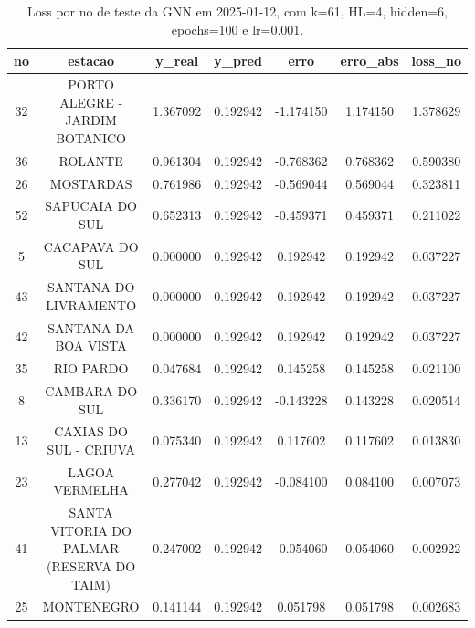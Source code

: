 \begin{table}[h]
\centering
\caption{Loss por no de teste da GNN em 2025-01-12, com k=61, HL=4, hidden=6, epochs=100 e lr=0.001.}
\label{tab:gnn_loss_k61_hl4_h6_e100_d20250112}
\begin{tabular}{ccccccc}
\toprule
no & estacao & y\_real & y\_pred & erro & erro\_abs & loss\_no \\
\midrule
32 & PORTO ALEGRE - JARDIM BOTANICO & 1.367092 & 0.192942 & -1.174150 & 1.174150 & 1.378629 \\
36 & ROLANTE & 0.961304 & 0.192942 & -0.768362 & 0.768362 & 0.590380 \\
26 & MOSTARDAS & 0.761986 & 0.192942 & -0.569044 & 0.569044 & 0.323811 \\
52 & SAPUCAIA DO SUL & 0.652313 & 0.192942 & -0.459371 & 0.459371 & 0.211022 \\
5 & CACAPAVA DO SUL & 0.000000 & 0.192942 & 0.192942 & 0.192942 & 0.037227 \\
43 & SANTANA DO LIVRAMENTO & 0.000000 & 0.192942 & 0.192942 & 0.192942 & 0.037227 \\
42 & SANTANA DA BOA VISTA & 0.000000 & 0.192942 & 0.192942 & 0.192942 & 0.037227 \\
35 & RIO PARDO & 0.047684 & 0.192942 & 0.145258 & 0.145258 & 0.021100 \\
8 & CAMBARA DO SUL & 0.336170 & 0.192942 & -0.143228 & 0.143228 & 0.020514 \\
13 & CAXIAS DO SUL - CRIUVA & 0.075340 & 0.192942 & 0.117602 & 0.117602 & 0.013830 \\
23 & LAGOA VERMELHA & 0.277042 & 0.192942 & -0.084100 & 0.084100 & 0.007073 \\
41 & SANTA VITORIA DO PALMAR (RESERVA DO TAIM) & 0.247002 & 0.192942 & -0.054060 & 0.054060 & 0.002922 \\
25 & MONTENEGRO & 0.141144 & 0.192942 & 0.051798 & 0.051798 & 0.002683 \\
\bottomrule
\end{tabular}
\end{table}

